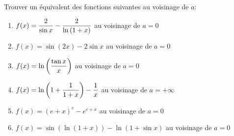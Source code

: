 \documentclass[a4paper, 11pt,reqno]{article}
\begin{document}
\begin{exercice}  \;
	Trouver un \'equivalent des fonctions suivantes au voisinage de $a$:
	\begin{enumerate}
		\item $f(x)=\displaystyle\frac{2}{\sin{x}} -\displaystyle\frac{2}{\ln{(1+x)}}$ au voisinage de $a=0$
		\item  $f(x)=\sin{(2x)}-2\sin{x}$ au voisinage de $a=0$
		\item  $f(x)=\ln{\left( \displaystyle\frac{\tan{x}}{x} \right)}$ au voisinage de $a=0$
		\item  $f(x)=\ln{\left( 1+\displaystyle\frac{1}{1+x} \right)}-\displaystyle\frac{1}{x}$ au voisinage de $a=+\infty$
		\item $f(x)=(e+x)^e -e^{e+x}$ au voisinage de $a=0$
		\item $f(x)=\sin{(\ln{(1+x)})}-\ln{(1+\sin{x})}$ au voisinage de $a=0$
	\end{enumerate}
\end{exercice}
\end{document}
